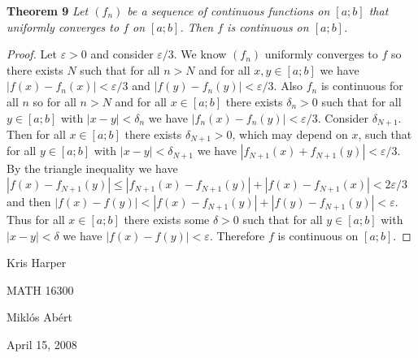 \documentclass{article}
\begin{document}
\begin{flushleft}
\textbf{Theorem 9}
\textsl{Let $(f_n)$ be a sequence of continuous functions on $[a;b]$ that uniformly converges to $f$ on $[a;b]$. Then $f$ is continuous on $[a;b]$.}
\begin{proof}
Let $\varepsilon > 0$ and consider $\varepsilon/3$. We know $(f_n)$ uniformly converges to $f$ so there exists $N$ such that for all $n>N$ and for all $x,y \in [a;b]$ we have $|f(x)-f_n(x)| < \varepsilon/3$ and $|f(y)-f_n(y)| < \varepsilon/3$. Also $f_n$ is continuous for all $n$ so for all $n>N$ and for all $x \in [a;b]$ there exists $\delta_n > 0$ such that for all $y \in [a;b]$ with $|x-y| < \delta_n$ we have $|f_n(x) - f_n(y)| < \varepsilon/3$. Consider $\delta_{N+1}$. Then for all $x \in [a;b]$ there exists $\delta_{N+1} > 0$, which may depend on $x$, such that for all $y \in [a;b]$ with $|x-y| < \delta_{N+1}$ we have $|f_{N+1}(x)+f_{N+1}(y)| < \varepsilon/3$. By the triangle inequality we have $|f(x)-f_{N+1}(y)| \leq |f_{N+1}(x)-f_{N+1}(y)| + |f(x)-f_{N+1}(x)| < 2\varepsilon/3$ and then $|f(x)-f(y)| < |f(x)-f_{N+1}(y)| + |f(y)-f_{N+1}(y)| < \varepsilon$. Thus for all $x \in [a;b]$ there exists some $\delta > 0$ such that for all $y \in [a;b]$ with $|x-y| < \delta$ we have $|f(x)-f(y)| < \varepsilon$. Therefore $f$ is continuous on $[a;b]$.
\end{proof}

\end{flushleft}

\newpage

\begin{flushright}
Kris Harper

MATH 16300

Mikl\'{o}s Ab\'{e}rt

April 15, 2008
\end{flushright}
\end{document}
